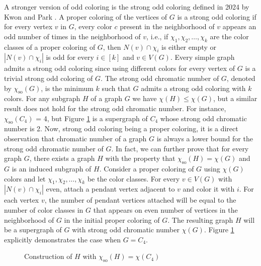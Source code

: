 \documentclass[12pt,a4paper]{article}
\theoremstyle{definition}
\numberwithin{equation}{section}
\begin{document}
A stronger version of odd coloring is the strong odd coloring defined in 2024 by Kwon and Park \cite{Kwon}. A proper coloring of the vertices of $G$ is a strong odd coloring if for every vertex $v$ in $G$, every color $c$ present in the neighborhood of $v$ appears an odd number of times in the neighborhood of $v$, i.e., if $\chi_1,\chi_2,\ldots,\chi_k$ are the color classes of a proper coloring of $G$, then $N(v) \cap \chi_i$ is either empty or $|N(v) \cap \chi_i|$ is odd for every $i \in [k]$ and $v \in V(G)$. Every simple graph admits a strong odd coloring since using different colors for every vertex of $G$ is a trivial strong odd coloring of $G$. The strong odd chromatic number of $G$, denoted by $\chi_{\text{so}}(G)$, is the minimum $k$ such that $G$ admits a strong odd coloring with $k$ colors. For any subgraph $H$ of a graph $G$ we have $\chi(H) \leq \chi(G)$, but a similar result does not hold for the strong odd chromatic number. For instance, $\chi_{\text{so}}(C_4)$ = 4, but Figure \ref{C4 corona K1} is a supergraph of $C_4$ whose strong odd chromatic number is 2. Now, strong odd coloring being a proper coloring, it is a direct observation that chromatic number of a graph $G$ is always a lower bound for the strong odd chromatic number of $G$. In fact, we can further prove that for every graph $G$, there exists a graph $H$ with the property that $\chi_{\text{so}}(H) = \chi(G)$ and $G$ is an induced subgraph of $H$. Consider a proper coloring of $G$ using $\chi(G)$ colors and let $\chi_1,\chi_2,\ldots,\chi_k$ be the color classes. For every $v \in V(G)$ with $|N(v) \cap \chi_i|$ even, attach a pendant vertex adjacent to $v$ and color it with $i$. For each vertex $v$, the number of pendant vertices attached will be equal to the number of color classes in $G$ that appears on even number of vertices in the neighborhood of $G$ in the initial proper coloring of $G$. The resulting graph $H$ will be a supergraph of $G$ with strong odd chromatic number $\chi(G)$. Figure \ref{C4 corona K1} explicitly demonstrates the case when $G = C_4$. \par

\begin{figure}[H] \label{C4 corona K1}
\centering
{}
\vspace{-0.3cm}
\caption{Construction of $H$ with $\chi_{\text{so}}(H) = \chi(C_4)$}
\end{figure}
\end{document}
